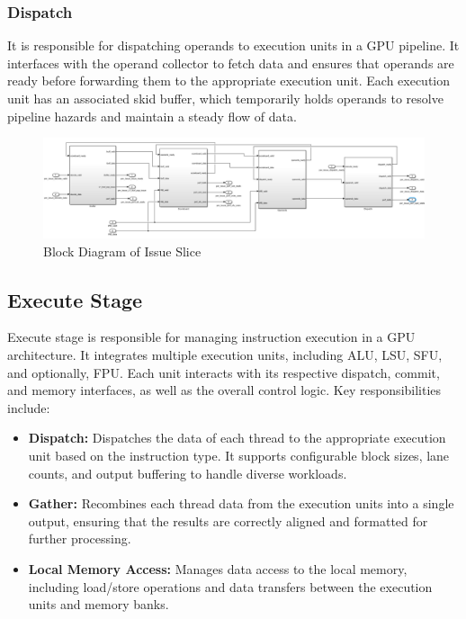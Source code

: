 \documentclass[12pt]{report}
\begin{document}
\subsubsection{Dispatch}
It is responsible for dispatching operands to execution units in a GPU pipeline. It interfaces with the operand collector to fetch data and ensures that operands are ready before forwarding them to the appropriate execution unit. Each execution unit has an associated skid buffer, which temporarily holds operands to resolve pipeline hazards and maintain a steady flow of data.

\begin{figure}[H]
    \centering
    \includegraphics[width=01\textwidth]{./figures/issue_slice.png}
    \caption{Block Diagram of Issue Slice}
\end{figure}

\subsection{Execute Stage} \label{execute}
Execute stage is responsible for managing instruction execution in a GPU architecture. It integrates multiple execution units, including ALU, LSU, SFU, and optionally, FPU. Each unit interacts with its respective dispatch, commit, and memory interfaces, as well as the overall control logic. Key responsibilities include:
\begin{itemize}
    \item \textbf{Dispatch:} Dispatches the data of each thread to the appropriate execution unit based on the instruction type. It supports configurable block sizes, lane counts, and output buffering to handle diverse workloads.
    \item \textbf{Gather:} Recombines each thread data from the execution units into a single output, ensuring that the results are correctly aligned and formatted for further processing.
    \item \textbf{Local Memory Access:} Manages data access to the local memory, including load/store operations and data transfers between the execution units and memory banks.
\end{itemize}
\end{document}
